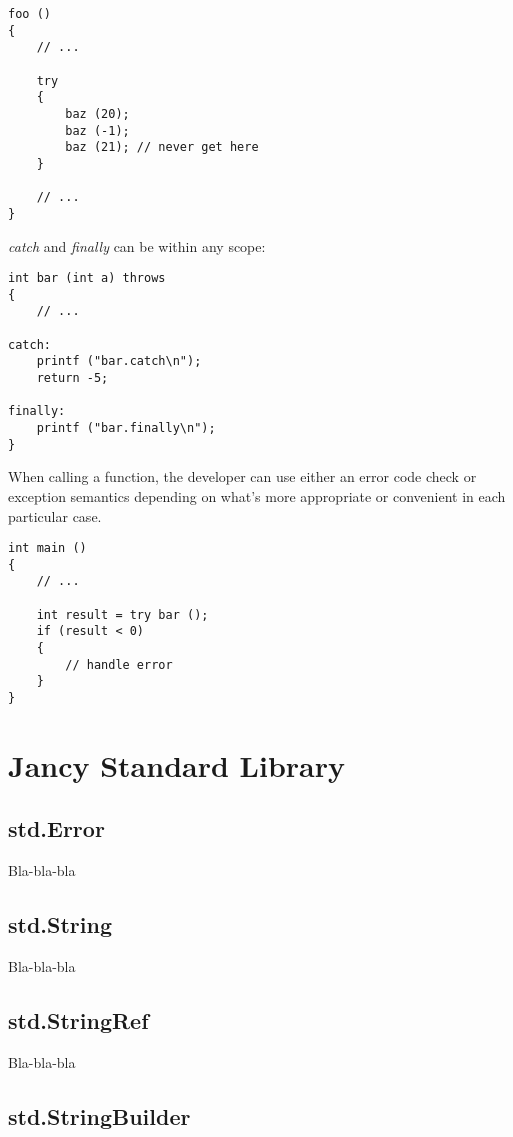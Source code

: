 \documentclass[oneside]{book}
\begin{document}
\begin{lstlisting}
foo ()
{
    // ...

    try
    {
        baz (20);
        baz (-1);
        baz (21); // never get here 
    }

    // ...
}
\end{lstlisting}

\emph{catch} and \emph{finally} can be within any scope:

\begin{lstlisting}
int bar (int a) throws
{
    // ...

catch: 
    printf ("bar.catch\n"); 
    return -5;

finally:
    printf ("bar.finally\n");   
}
\end{lstlisting}

When calling a function, the developer can use either an error code check or exception semantics depending on what's more appropriate or convenient in each particular case.

\begin{lstlisting}
int main ()
{
    // ...

    int result = try bar ();
    if (result < 0)
    {
        // handle error
    }
}
\end{lstlisting}

\chapter{Jancy Standard Library}

\section{std.Error}

Bla-bla-bla

\section{std.String}

Bla-bla-bla

\section{std.StringRef}

Bla-bla-bla

\section{std.StringBuilder}
\end{document}
